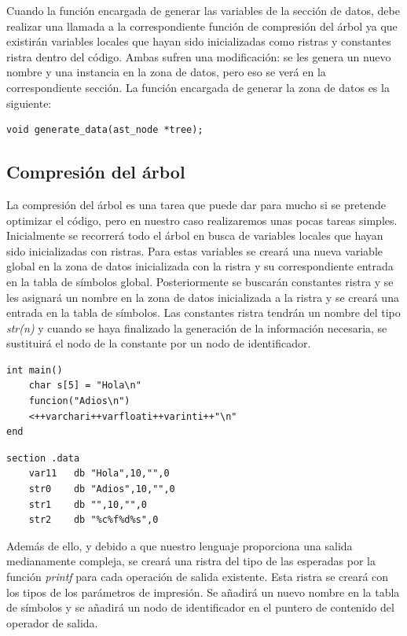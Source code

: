 \documentclass[a4paper,10pt]{article}
\begin{document}
Cuando la función encargada de generar las variables de la sección de datos, debe realizar una llamada a la correspondiente función de compresión del árbol ya que existirán variables locales que hayan sido inicializadas como ristras y constantes ristra dentro del código. Ambas sufren una modificación: se les genera un nuevo nombre y una instancia en la zona de datos, pero eso se verá en la correspondiente sección. La función encargada de generar la zona de datos es la siguiente:

\begin{lstlisting}
void generate_data(ast_node *tree);
\end{lstlisting}

\subsection{Compresión del árbol}

La compresión del árbol es una tarea que puede dar para mucho si se pretende optimizar el código, pero en nuestro caso realizaremos unas pocas tareas simples. Inicialmente se recorrerá todo el árbol en busca de variables locales que hayan sido inicializadas con ristras. Para estas variables se creará una nueva variable global en la zona de datos inicializada con la ristra y su correspondiente entrada en la tabla de símbolos global. Posteriormente se buscarán constantes ristra y se les asignará un nombre en la zona de datos inicializada a la ristra y se creará una entrada en la tabla de símbolos. Las constantes ristra tendrán un nombre del tipo \emph{str(n)} y cuando se haya finalizado la generación de la información necesaria, se sustituirá el nodo de la constante por un nodo de identificador.
\begin{multicols}{2}
\begin{lstlisting}[language=jam,frame=single]
int main()
	char s[5] = "Hola\n"
	funcion("Adios\n")
	<++varchari++varfloati++varinti++"\n"
end
\end{lstlisting}

\begin{lstlisting}[frame=single]
section .data
	var11	db "Hola",10,"",0
	str0	db "Adios",10,"",0
	str1	db "",10,"",0
	str2	db "%c%f%d%s",0
\end{lstlisting}
\end{multicols}


Además de ello, y debido a que nuestro lenguaje proporciona una salida medianamente compleja, se creará una ristra del tipo de las esperadas por la función \textit{printf} para cada operación de salida existente. Esta ristra se creará con los tipos de los parámetros de impresión. Se añadirá un nuevo nombre en la tabla de símbolos y se añadirá un nodo de identificador en el puntero de contenido del operador de salida.
\end{document}
